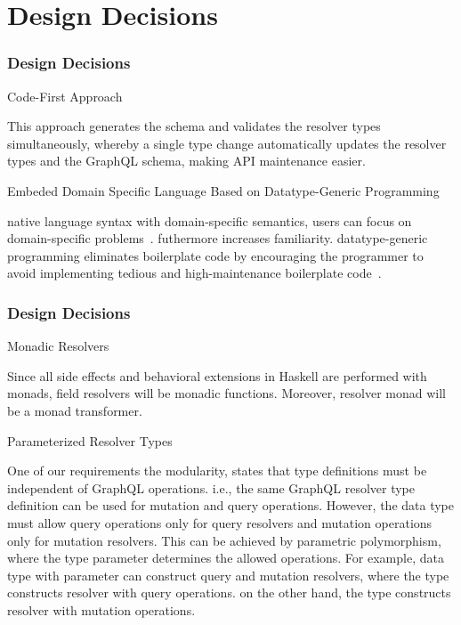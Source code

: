 
\section{Design Decisions} 

\begin{frame}\frametitle{Design Decisions}
\begin{alertblock}{Code-First Approach}  

This approach generates the schema and validates the resolver types simultaneously, whereby a single type change automatically updates the resolver types and the GraphQL schema, making API maintenance easier.

\end{alertblock}

\begin{alertblock}{Embeded Domain Specific Language Based on Datatype-Generic Programming}  

native language syntax with domain-specific semantics, users can focus on domain-specific problems~\cite{edsl-modeling}. futhermore increases familiarity. datatype-generic programming eliminates boilerplate code by encouraging the programmer to avoid implementing tedious and high-maintenance boilerplate code~\cite{scrap-your-boilerplate}.

\end{alertblock}

\end{frame}

\begin{frame}\frametitle{Design Decisions}

\begin{alertblock}{Monadic Resolvers} 

Since all side effects and behavioral extensions in Haskell are performed with monads, field resolvers will be monadic functions. 
Moreover, resolver monad will be a monad transformer. 

\end{alertblock}


\begin{alertblock}{Parameterized Resolver Types}

One of our requirements the modularity, states that type definitions must be independent of GraphQL operations. i.e., the same GraphQL resolver type definition can be used for mutation and query operations. However, the data type must allow query operations only for query resolvers and mutation operations only for mutation resolvers. This can be achieved by parametric polymorphism, where the type parameter determines the allowed operations. For example,  data type  with parameter  can construct query and mutation resolvers, where the type  constructs resolver  with query operations. on the other hand, the type  constructs resolver  with mutation operations.

\end{alertblock}
\end{frame}